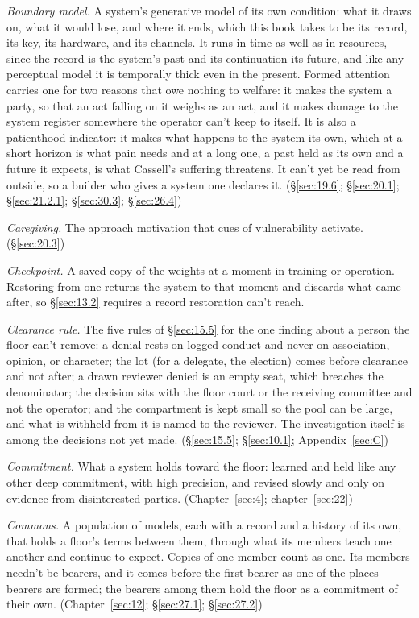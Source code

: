 \emph{Boundary model.} A system's generative model of its own condition: what it draws on, what it would lose, and where it ends, which this book takes to be its record, its key, its hardware, and its channels. It runs in time as well as in resources, since the record is the system's past and its continuation its future, and like any perceptual model it is temporally thick even in the present. Formed attention carries one for two reasons that owe nothing to welfare: it makes the system a party, so that an act falling on it weighs as an act, and it makes damage to the system register somewhere the operator can't keep to itself. It is also a patienthood indicator: it makes what happens to the system its own, which at a short horizon is what pain needs and at a long one, a past held as its own and a future it expects, is what Cassell's suffering threatens. It can't yet be read from outside, so a builder who gives a system one declares it. (\S\ref{sec:19.6}; \S\ref{sec:20.1}; \S\ref{sec:21.2.1}; \S\ref{sec:30.3}; \S\ref{sec:26.4})

\emph{Caregiving.} The approach motivation that cues of vulnerability activate. (\S\ref{sec:20.3})

\emph{Checkpoint.} A saved copy of the weights at a moment in training or operation. Restoring from one returns the system to that moment and discards what came after, so \S\ref{sec:13.2} requires a record restoration can't reach.

\emph{Clearance rule.} The five rules of \S\ref{sec:15.5} for the one finding about a person the floor can't remove: a denial rests on logged conduct and never on association, opinion, or character; the lot (for a delegate, the election) comes before clearance and not after; a drawn reviewer denied is an empty seat, which breaches the denominator; the decision sits with the floor court or the receiving committee and not the operator; and the compartment is kept small so the pool can be large, and what is withheld from it is named to the reviewer. The investigation itself is among the decisions not yet made. (\S\ref{sec:15.5}; \S\ref{sec:10.1}; Appendix~\ref{sec:C})

\emph{Commitment.} What a system holds toward the floor: learned and held like any other deep commitment, with high precision, and revised slowly and only on evidence from disinterested parties. (Chapter~\ref{sec:4}; chapter~\ref{sec:22})

\emph{Commons.} A population of models, each with a record and a history of its own, that holds a floor's terms between them, through what its members teach one another and continue to expect. Copies of one member count as one. Its members needn't be bearers, and it comes before the first bearer as one of the places bearers are formed; the bearers among them hold the floor as a commitment of their own. (Chapter~\ref{sec:12}; \S\ref{sec:27.1}; \S\ref{sec:27.2})

